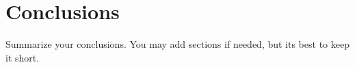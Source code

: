 \chapter{Conclusions\label{chap:4}}
Summarize your conclusions. You may add sections if needed, but its best to keep it short.



